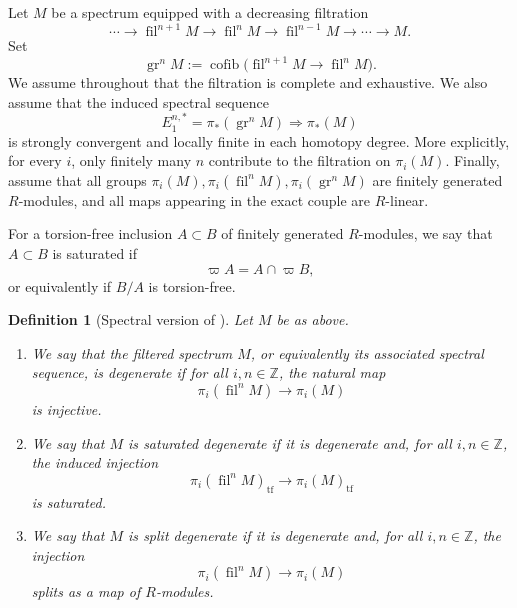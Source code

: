\documentclass[11pt]{amsart}
\newtheorem{definition}[lemma]{Definition}
\numberwithin{equation}{section}
\newcommand{\tf}{\operatorname{tf}}
\newcommand{\gr}{{\operatorname{gr}}}
\newcommand{\fil}{{\operatorname{fil}}}
\numberwithin{equation}{section}
\begin{document}
Let $M$ be a spectrum equipped with a decreasing filtration
\begin{equation*}
  \cdots \longrightarrow \fil^{n+1}M
  \longrightarrow \fil^n M
  \longrightarrow \fil^{n-1}M
  \longrightarrow \cdots
  \longrightarrow M .
\end{equation*}
Set
\begin{equation*}
  \gr^n M :=
  \operatorname{cofib}\bigl(\fil^{n+1}M\to \fil^n M\bigr).
\end{equation*}
We assume throughout that the filtration is complete and exhaustive. We also assume that the induced spectral sequence
\begin{equation*}
  E_1^{n,*}=\pi_*(\gr^n M)\Longrightarrow \pi_*(M)
\end{equation*}
is strongly convergent and locally finite in each homotopy degree. More
explicitly, for every $i$, only finitely many $n$ contribute to the
filtration on $\pi_i(M)$. Finally, assume that all groups $\pi_i(M),\pi_i(\fil^nM), \pi_i(\gr^nM)$ are finitely generated $R$-modules, and all maps appearing in the exact
couple are $R$-linear.

For a torsion-free inclusion $A\subset B$ of finitely generated
$R$-modules, we say that $A\subset B$ is saturated if
\begin{equation*}
  \varpi A=A\cap \varpi B,
\end{equation*}
or equivalently if $B/A$ is torsion-free.

\begin{definition}[{Spectral version of \cite[Definition 2.3]{L22}}]
Let $M$ be as above.

\begin{enumerate}
\item We say that the filtered spectrum $M$, or equivalently its associated
spectral sequence, is \emph{degenerate} if for all $i,n\in \mathbb Z$, the
natural map
\begin{equation*}
  \pi_i(\fil^nM)\longrightarrow \pi_i(M)
\end{equation*}
is injective.

\item We say that $M$ is \emph{saturated degenerate} if it is degenerate
and, for all $i,n\in \mathbb Z$, the induced injection
\begin{equation*}
  \pi_i(\fil^nM)_{\tf}\longrightarrow \pi_i(M)_{\tf}
\end{equation*}
is saturated.

\item We say that $M$ is \emph{split degenerate} if it is degenerate and,
for all $i,n\in \mathbb Z$, the injection
\begin{equation*}
  \pi_i(\fil^nM)\longrightarrow \pi_i(M)
\end{equation*}
splits as a map of $R$-modules.
\end{enumerate}
\end{definition}
\end{document}
